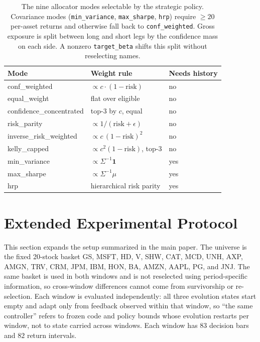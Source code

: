 \documentclass[letterpaper]{article}
\begin{document}
\begin{table}[tb]
\centering
\footnotesize
\setlength{\tabcolsep}{4pt}
\begin{tabular}{@{}lll@{}}
\toprule
Mode & Weight rule & Needs history \\
\midrule
conf\_weighted            & $\propto c\cdot(1-\text{risk})$ & no \\
equal\_weight             & flat over eligible & no \\
confidence\_concentrated  & top-$3$ by $c$, equal & no \\
risk\_parity              & $\propto 1/(\text{risk}+\epsilon)$ & no \\
inverse\_risk\_weighted   & $\propto c\,(1-\text{risk})^2$ & no \\
kelly\_capped             & $\propto c^2(1-\text{risk})$, top-$3$ & no \\
min\_variance             & $\propto \Sigma^{-1}\mathbf{1}$ & yes \\
max\_sharpe               & $\propto \Sigma^{-1}\mu$ & yes \\
hrp                       & hierarchical risk parity & yes \\
\bottomrule
\end{tabular}
\caption{The nine allocator modes selectable by the strategic policy. Covariance
modes (\texttt{min\_variance}, \texttt{max\_sharpe}, \texttt{hrp}) require ${\ge}20$
per-asset returns and otherwise fall back to \texttt{conf\_weighted}. Gross exposure
is split between long and short legs by the confidence mass on each side. A nonzero
\texttt{target\_beta} shifts this split without reselecting names.}
\label{tab:optimizers}
\end{table}

\section{Extended Experimental Protocol}
\label{app:protocol}

This section expands the setup summarized in the main paper. The universe is the
fixed 20-stock basket GS, MSFT, HD, V, SHW, CAT, MCD, UNH, AXP, AMGN, TRV, CRM,
JPM, IBM, HON, BA, AMZN, AAPL, PG, and JNJ. The same basket is used in both windows
and is not reselected using period-specific information, so cross-window
differences cannot come from survivorship or re-selection. Each window is evaluated
independently: all three evolution states start empty and adapt only from feedback
observed within that window, so ``the same controller'' refers to frozen code and
policy bounds whose evolution restarts per window, not to state carried across
windows. Each window has $83$ decision bars and $82$ return intervals.
\end{document}
